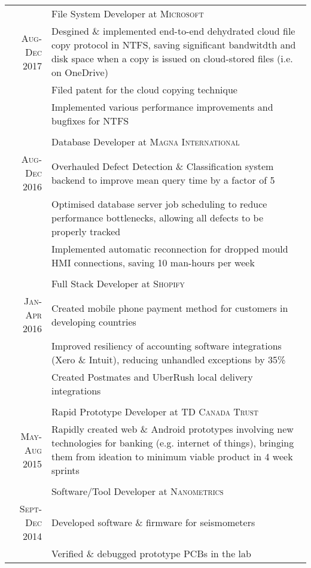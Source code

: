 \documentclass[a4paper,10pt]{article}
\begin{document}
\begin{tabular}{r|p{15.4cm}}
& File System Developer at \textsc{Microsoft} \\ \textsc{Aug-Dec 2017}
&\footnotesize{Desgined \& implemented end-to-end dehydrated cloud file copy protocol in NTFS, saving significant bandwitdth and disk space when a copy is issued on cloud-stored files (i.e. on OneDrive)}\\
&\footnotesize{Filed patent for the cloud copying technique}\\
&\footnotesize{Implemented various performance improvements and bugfixes for NTFS}\\

\multicolumn{2}{c}{} \\
& Database Developer at \textsc{Magna International} \\ \textsc{Aug-Dec 2016}
&\footnotesize{Overhauled Defect Detection \& Classification system backend to improve mean query time by a factor of 5}\\
&\footnotesize{Optimised database server job scheduling to reduce performance bottlenecks, allowing all defects to be properly tracked}\\
&\footnotesize{Implemented automatic reconnection for dropped mould HMI connections, saving 10 man-hours per week}\\


\multicolumn{2}{c}{} \\
& Full Stack Developer at \textsc{Shopify} \\
\textsc{Jan-Apr 2016}
&\footnotesize{Created mobile phone payment method for customers in developing countries}\\
&\footnotesize{Improved resiliency of accounting software integrations (Xero \& Intuit), reducing unhandled exceptions by 35\%}\\
&\footnotesize{Created Postmates and UberRush local delivery integrations}\\

\multicolumn{2}{c}{} \\
& Rapid Prototype Developer at \textsc{TD Canada Trust}\\
\textsc{May-Aug 2015}
&\footnotesize{Rapidly created web \& Android prototypes involving new technologies for banking (e.g. internet of things), bringing them from ideation to minimum viable product in 4 week sprints}\\

\multicolumn{2}{c}{}\\
& Software/Tool Developer at \textsc{Nanometrics} \\
\textsc{Sept-Dec 2014}
&\footnotesize{Developed software \& firmware for seismometers}\\
&\footnotesize{Verified \& debugged prototype PCBs in the lab}\\
\end{tabular}
\end{document}
